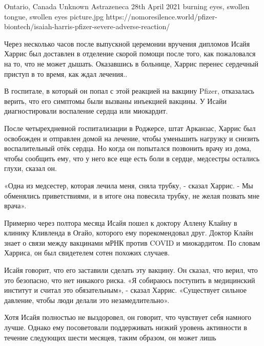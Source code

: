           {Ontario, Canada}
          {Unknown}
          {Astrazeneca}
          {28th April 2021}
          {burning eyes, swollen tongue, swollen eyes}
          {picture.jpg}
          {https://nomoresilence.world/pfizer-biontech/isaiah-harris-pfizer-severe-adverse-reaction/}
          {

          Через несколько часов после выпускной церемонии вручения дипломов
          Исайя Харрис был доставлен в отделение скорой помощи после того, как
          пожаловался на то, что не может дышать. Оказавшись в больнице, Харрис
          перенес сердечный приступ в то время, как ждал лечения..

          В госпитале, в который он попал с этой реакцией на вакцину Pfizer,
          отказалась верить, что его симптомы были вызваны инъекцией вакцины. У
          Исайи диагностировали воспаление сердца или миокардит.

          После четырехдневной госпитализации в Роджерсе, штат Арканзас, Харрис
          был освобожден и отправлен домой на лечение, чтобы уменьшить нагрузку
          и снизить воспалительный отёк сердца. Но когда он попытался позвонить
          врачу из дома, чтобы сообщить ему, что у него все еще есть боли в
          сердце, медсестры остались глухи, сказал он.

          «Одна из медсестер, которая лечила меня, сняла трубку, - сказал
          Харрис. - Мы обменялись приветствиями, и в итоге она повесила трубку,
          не желая позвать мне врача».

          Примерно через полтора месяца Исайя пошел к доктору Аллену Клайну в
          клинику Кливленда в Огайо, которого ему порекомендовал друг. Доктор
          Клайн знает о связи между вакцинами мРНК против COVID и
          миокардитом. По словам Харриса, он был свидетелем сотен похожих
          случаев.

          Исайя говорит, что его заставили сделать эту вакцину. Он сказал, что
          верил, что это безопасно, что нет никакого риска. «Я собираюсь
          поступить в медицинский институт и считал это обязательным», - сказал
          Харрис. «Существует сильное давление, чтобы люди делали это
          незамедлительно».

          Хотя Исайя полностью не выздоровел, он говорит, что чувствует себя
          намного лучше. Однако ему посоветовали поддерживать низкий уровень
          активности в течение следующих шести месяцев, таким образом, он может
          лишь

          }

